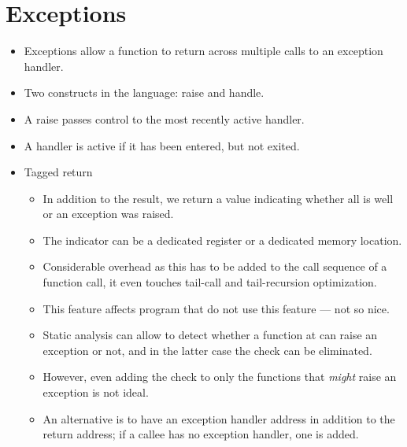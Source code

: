 \section{Exceptions}

\begin{itemize}

\item Exceptions allow a function to return across multiple calls to an
exception handler.

\item Two constructs in the language: raise and handle.

\item A raise passes control to the most recently active handler.

\item A handler is active if it has been entered, but not exited.

\item Tagged return

\begin{itemize}

\item In addition to the result, we return a value indicating whether all is
well or an exception was raised.

\item The indicator can be a dedicated register or a dedicated memory location.

\item Considerable overhead as this has to be added to the call sequence of a
function call, it even touches tail-call and tail-recursion optimization.

\item This feature affects program that do not use this feature --- not so
nice.

\item Static analysis can allow to detect whether a function at can raise an
exception or not, and in the latter case the check can be eliminated.

\item However, even adding the check to only the functions that \emph{might}
raise an exception is not ideal.

\item An alternative is to have an exception handler address in addition to the
return address; if a callee has no exception handler, one is added.

\end{itemize}


\end{itemize}
